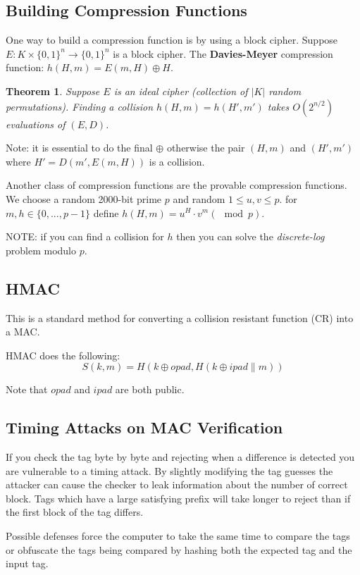 \documentclass[twoside]{article}
\newcounter{lecnum}
\newtheorem{theorem}{Theorem}[lecnum]
\def\xor{\oplus}
\begin{document}
\subsection{Building Compression Functions}

One way to build a compression function is by using a block cipher. Suppose $E: K \times \{0, 1\}^n \rightarrow \{0,1\}^n$ is a block cipher. The \textbf{Davies-Meyer} compression function: $h(H, m) = E(m, H) \xor H$. 

\begin{theorem}
Suppose $E$ is an ideal cipher (collection of $|K|$ random permutations). Finding a collision $h(H, m) = h(H', m')$ takes $O(2^{n/2})$ evaluations of $(E, D)$.
\end{theorem}

Note: it is essential to do the final  $\xor$ otherwise the pair $(H, m)$ and $(H', m')$ where $H' = D(m', E(m, H))$ is a collision.

Another class of compression functions are the provable compression functions. We choose a random 2000-bit prime $p$ and random $1 \leq u, v \leq p$. for $m, h \in \{0, ..., p-1\}$ define $h(H, m) = u^H \cdot v^m (\mod p)$.

NOTE: if you can find a collision for $h$ then you can solve the \emph{discrete-log} problem modulo $p$.

\subsection{HMAC}
This is a standard method for converting a collision resistant function (CR) into a MAC.

HMAC does the following:
\[S(k, m) = H\left(k \xor opad, H\left(k \xor ipad \parallel m\right)\right)\]

Note that $opad$ and $ipad$ are both public. 

\subsection{Timing Attacks on MAC Verification}
If you check the tag byte by byte and rejecting when a difference is detected you are vulnerable to a timing attack. By slightly modifying the tag guesses the attacker can cause the checker to leak information about the number of correct block. Tags which have a large satisfying prefix will take longer to reject than if the first block of the tag differs.  

Possible defenses force the computer to take the same time to compare the tags or obfuscate the tags being compared by hashing both the expected tag and the input tag.
\end{document}
